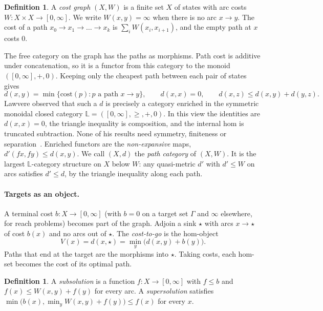 \documentclass[11pt]{article}
\theoremstyle{definition}
\newtheorem{definition}[theorem]{Definition}
\theoremstyle{remark}
\newcommand{\Lq}{\mathbb{L}}           %
\newcommand{\dd}{d}
\newcommand{\tgt}{\star}
\begin{document}
\begin{definition}
A \emph{cost graph} $(X, W)$ is a finite set $X$ of states with arc costs
$W : X \times X \to [0,\infty]$. We write $W(x,y) = \infty$ when there is no arc
$x \to y$. The cost of a path $x_0 \to x_1 \to \dots \to x_k$ is
$\sum_i W(x_i, x_{i+1})$, and the empty path at $x$ costs $0$.
\end{definition}

The free category on the graph has the paths as morphisms. Path cost is additive
under concatenation, so it is a functor from this category to the monoid
$([0,\infty], +, 0)$. Keeping only the cheapest path between each pair of states
gives
\[
\dd(x,y) = \min\{\text{cost}(p) : p \text{ a path } x \to y\}, \qquad
\dd(x,x) = 0, \qquad \dd(x,z) \le \dd(x,y) + \dd(y,z).
\]
Lawvere observed that such a $\dd$ is precisely a category enriched in the
symmetric monoidal closed category $\Lq = ([0,\infty], \ge, +, 0)$. In this view
the identities are $\dd(x,x)=0$, the triangle inequality is composition, and the
internal hom is truncated subtraction. None of his results need symmetry,
finiteness or separation~\cite[\S1]{lawvere1973}. Enriched functors are the
\emph{non-expansive} maps, $\dd'(fx, fy) \le \dd(x,y)$. We call $(X,\dd)$ the
\emph{path category} of $(X,W)$. It is the largest $\Lq$-category structure on $X$
below $W$: any quasi-metric $\dd'$ with $\dd' \le W$ on arcs satisfies
$\dd' \le \dd$, by the triangle inequality along each path.

\paragraph{Targets as an object.}
A terminal cost $b : X \to [0,\infty]$ (with $b = 0$ on a target set $\Gamma$ and
$\infty$ elsewhere, for reach problems) becomes part of the graph. Adjoin a sink
$\tgt$ with arcs $x \to \tgt$ of cost $b(x)$ and no arcs out of $\tgt$. The
\emph{cost-to-go} is the hom-object
\[ V(x) = \dd(x, \tgt) = \min_{y}\big(\dd(x,y) + b(y)\big). \]
Paths that end at the target are the morphisms into $\tgt$. Taking costs,
each hom-set becomes the cost of its optimal path.

\begin{definition}
A \emph{subsolution} is a function $f : X \to [0,\infty]$ with $f \le b$ and
$f(x) \le W(x,y) + f(y)$ for every arc. A \emph{supersolution} satisfies
$\min\big(b(x), \min_y W(x,y) + f(y)\big) \le f(x)$ for every $x$.
\end{definition}
\end{document}
